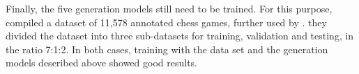 Finally, the five generation models still need to be trained. For this purpose, \cite{jhamtani-etal-2018-learning} compiled a dataset of 11,578 annotated chess games, further used by \citep{zang-etal-2019-automated}. they divided the dataset into three sub-datasets for training, validation and testing, in the ratio 7:1:2. In both cases, training with the data set and the generation models described above showed good results.







